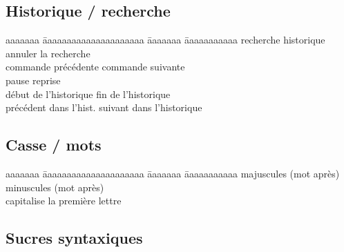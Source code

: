 \documentclass{article}
\let\oldkeys\keys
\renewcommand{\keys}[1]{\small\oldkeys{#1}\normalsize}
\begin{document}
\begin{multicols}{4}
    \subsection*{Historique / recherche}

    \begin{tabbing}
        aaaaaaa \= aaaaaaaaaaaaaaaaaaaaa \= aaaaaaa \= aaaaaaaaaaa \kill
         \> recherche historique                \>
         \> annuler la recherche                \\
         \> commande précédente                 \>
         \> commande suivante                   \\
         \> pause                               \>
         \> reprise                             \\
        \keys{\Alt + <}  \> début de l'historique               \>
        \keys{\Alt + >}  \> fin de l'historique                 \\
          \> précédent dans l'hist.         \>
          \> suivant dans l'historique
    \end{tabbing}

    \subsection*{Casse / mots}

    \begin{tabbing}
        aaaaaaa \= aaaaaaaaaaaaaaaaaaaaa \= aaaaaaa \= aaaaaaaaaaa \kill
         \> majuscules (mot après)        \>
         \> minuscules (mot après)        \\
         \> capitalise la première lettre
    \end{tabbing}

    \subsection*{Sucres syntaxiques}


\end{multicols}
\end{document}
